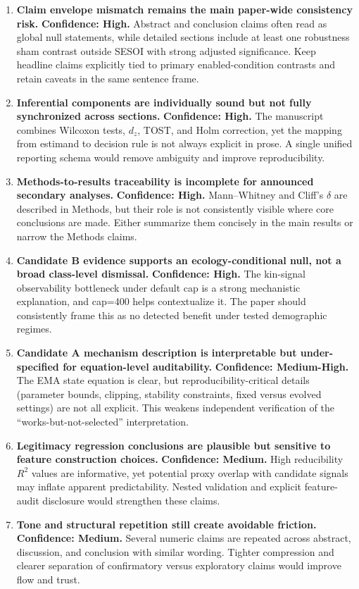 \documentclass[11pt]{article}
\begin{document}
\begin{enumerate}
\item \textbf{Claim envelope mismatch remains the main paper-wide consistency risk.} \textbf{Confidence: High.}  
Abstract and conclusion claims often read as global null statements, while detailed sections include at least one robustness sham contrast outside SESOI with strong adjusted significance. Keep headline claims explicitly tied to primary enabled-condition contrasts and retain caveats in the same sentence frame.

\item \textbf{Inferential components are individually sound but not fully synchronized across sections.} \textbf{Confidence: High.}  
The manuscript combines Wilcoxon tests, \(d_z\), TOST, and Holm correction, yet the mapping from estimand to decision rule is not always explicit in prose. A single unified reporting schema would remove ambiguity and improve reproducibility.

\item \textbf{Methods-to-results traceability is incomplete for announced secondary analyses.} \textbf{Confidence: High.}  
Mann--Whitney and Cliff's \(\delta\) are described in Methods, but their role is not consistently visible where core conclusions are made. Either summarize them concisely in the main results or narrow the Methods claims.

\item \textbf{Candidate B evidence supports an ecology-conditional null, not a broad class-level dismissal.} \textbf{Confidence: High.}  
The kin-signal observability bottleneck under default cap is a strong mechanistic explanation, and cap=400 helps contextualize it. The paper should consistently frame this as no detected benefit under tested demographic regimes.

\item \textbf{Candidate A mechanism description is interpretable but under-specified for equation-level auditability.} \textbf{Confidence: Medium-High.}  
The EMA state equation is clear, but reproducibility-critical details (parameter bounds, clipping, stability constraints, fixed versus evolved settings) are not all explicit. This weakens independent verification of the ``works-but-not-selected'' interpretation.

\item \textbf{Legitimacy regression conclusions are plausible but sensitive to feature construction choices.} \textbf{Confidence: Medium.}  
High reducibility \(R^2\) values are informative, yet potential proxy overlap with candidate signals may inflate apparent predictability. Nested validation and explicit feature-audit disclosure would strengthen these claims.

\item \textbf{Tone and structural repetition still create avoidable friction.} \textbf{Confidence: Medium.}  
Several numeric claims are repeated across abstract, discussion, and conclusion with similar wording. Tighter compression and clearer separation of confirmatory versus exploratory claims would improve flow and trust.
\end{enumerate}
\end{document}
